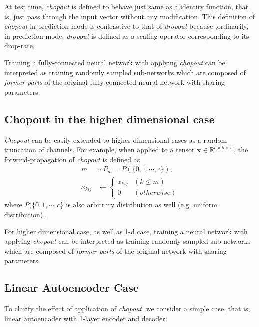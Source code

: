 \documentclass{article}
\begin{document}
    At test time, \textit{chopout} is defined to behave just same as a identity function, that is, just pass through the input vector without any modification. This definition of \textit{chopout} in prediction mode is contrastive to that of \textit{dropout} because ,ordinarily, in prediction mode, \textit{dropout} is defined as a scaling operator corresponding to its drop-rate.
    
    Training a fully-connected neural network with applying \textit{chopout} can be interpreted as training randomly sampled sub-networks which are composed of \textit{former parts} of the original fully-connected neural network with sharing parameters.

    \subsection{Chopout in the higher dimensional case}
    \label{subsec:chopout-nd}
    
    \textit{Chopout} can be easily extended to higher dimensional cases as a random truncation of channels. 
    For example, when applied to a tensor $\mathbf{x} \in 
    \mathbb{R}^{c \times h \times w}$, the forward-propagation of \textit{chopout} is defined as
    \begin{align}
        m &\sim P_m = P(\{0, 1, \cdots, c\}), \nonumber \\
        x_{kij} &\leftarrow \begin{cases}
            x_{kij} & (k \leq m) \\
            0 & (otherwise)
            \end{cases} \nonumber
    \end{align}
    where $P(\{0, 1, \cdots, c\}$ is also arbitrary distribution as well (e.g. uniform distribution). 
    
    For higher dimensional case, as well as 1-d case, training a neural network with applying \textit{chopout} can be interpreted as training randomly sampled sub-networks which are composed of \textit{former parts} of the original network with sharing parameters.
    
    \subsection{Linear Autoencoder Case}
    \label{subsec:linae}
    
    To clarify the effect of application of \textit{chopout}, we consider a simple case, that is, linear autoencoder with 1-layer encoder and decoder:
    
\end{document}
